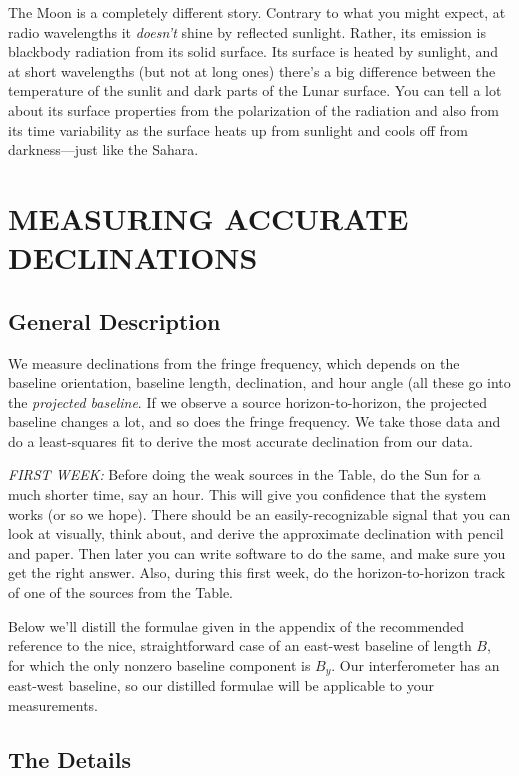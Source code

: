 \documentclass[11pt,preprint]{aastex}
\begin{document}
	The Moon is a completely different story. Contrary to what you
might expect, at radio wavelengths it {\it doesn't} shine by reflected
sunlight. Rather, its emission is blackbody radiation from its solid
surface. Its surface is heated by sunlight, and at short wavelengths
(but not at long ones) there's a big difference between the temperature
of the sunlit and dark parts of the Lunar surface. You can tell a lot
about its surface properties from the polarization of the radiation and
also from its time variability as the surface heats up from sunlight and
cools off from darkness---just like the Sahara.

\section {MEASURING ACCURATE DECLINATIONS} \label{declinations}

\subsection{General Description}

	We measure declinations from the fringe frequency, which depends
on the baseline orientation, baseline length, declination, and hour
angle (all these go into the {\it projected baseline}. If we observe a
source horizon-to-horizon, the projected baseline changes a lot, and so
does the fringe frequency. We take those data and do a least-squares
fit to derive the most accurate declination from our data.

	{\it FIRST WEEK:} Before doing the weak sources in the Table, do
the Sun for a much shorter time, say an hour. This will give you
confidence that the system works (or so we hope). There should be an
easily-recognizable signal that you can look at visually, think about,
and derive the approximate declination with pencil and paper. Then later
you can write software to do the same, and make sure you get the right
answer.  Also, during this first week, do the horizon-to-horizon track
of one of the sources from the Table.

	Below we'll distill the formulae given in the appendix of the
recommended reference to the nice, straightforward case of an east-west
baseline of length $B$, for which the only nonzero baseline component is
$B_y$. Our interferometer has an east-west baseline, so our distilled
formulae will be applicable to your measurements.  

\subsection{The Details}
\end{document}
